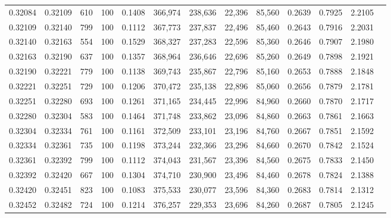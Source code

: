 \begin{tabular}{rrrrrrrrrrrrr}
0.32084 & 0.32109 &    610 & 100 &                                     0.1408 & 366,974 & 238,636 &  22,396 &  85,560 & 0.2639 & 0.7925 & 2.2105 \\
0.32109 & 0.32140 &    799 & 100 &                                     0.1112 & 367,773 & 237,837 &  22,496 &  85,460 & 0.2643 & 0.7916 & 2.2031 \\
0.32140 & 0.32163 &    554 & 100 &                                     0.1529 & 368,327 & 237,283 &  22,596 &  85,360 & 0.2646 & 0.7907 & 2.1980 \\
0.32163 & 0.32190 &    637 & 100 &                                     0.1357 & 368,964 & 236,646 &  22,696 &  85,260 & 0.2649 & 0.7898 & 2.1921 \\
0.32190 & 0.32221 &    779 & 100 &                                     0.1138 & 369,743 & 235,867 &  22,796 &  85,160 & 0.2653 & 0.7888 & 2.1848 \\
0.32221 & 0.32251 &    729 & 100 &                                     0.1206 & 370,472 & 235,138 &  22,896 &  85,060 & 0.2656 & 0.7879 & 2.1781 \\
0.32251 & 0.32280 &    693 & 100 &                                     0.1261 & 371,165 & 234,445 &  22,996 &  84,960 & 0.2660 & 0.7870 & 2.1717 \\
0.32280 & 0.32304 &    583 & 100 &                                     0.1464 & 371,748 & 233,862 &  23,096 &  84,860 & 0.2663 & 0.7861 & 2.1663 \\
0.32304 & 0.32334 &    761 & 100 &                                     0.1161 & 372,509 & 233,101 &  23,196 &  84,760 & 0.2667 & 0.7851 & 2.1592 \\
0.32334 & 0.32361 &    735 & 100 &                                     0.1198 & 373,244 & 232,366 &  23,296 &  84,660 & 0.2670 & 0.7842 & 2.1524 \\
0.32361 & 0.32392 &    799 & 100 &                                     0.1112 & 374,043 & 231,567 &  23,396 &  84,560 & 0.2675 & 0.7833 & 2.1450 \\
0.32392 & 0.32420 &    667 & 100 &                                     0.1304 & 374,710 & 230,900 &  23,496 &  84,460 & 0.2678 & 0.7824 & 2.1388 \\
0.32420 & 0.32451 &    823 & 100 &                                     0.1083 & 375,533 & 230,077 &  23,596 &  84,360 & 0.2683 & 0.7814 & 2.1312 \\
0.32452 & 0.32482 &    724 & 100 &                                     0.1214 & 376,257 & 229,353 &  23,696 &  84,260 & 0.2687 & 0.7805 & 2.1245 \\

\end{tabular}
